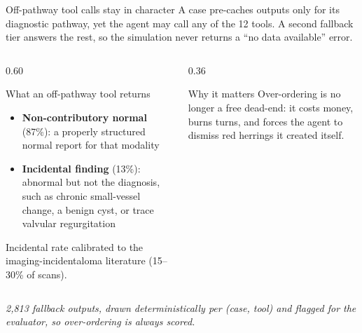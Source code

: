 \documentclass[aspectratio=169,t]{beamer}
\begin{document}
\begin{frame}{Off-pathway tool calls stay in character}
  \footnotesize
  A case pre-caches outputs only for its diagnostic pathway, yet the
  agent may call any of the 12 tools. A second \alert{fallback tier}
  answers the rest, so the simulation never returns a ``no data
  available'' error.

  \vspace{1mm}
  \begin{columns}[T,onlytextwidth]
    \begin{column}{0.60\textwidth}
      \begin{block}{What an off-pathway tool returns}
        \footnotesize
        \begin{itemize}\setlength\itemsep{0.3em}
          \item \textbf{Non-contributory normal} (87\%): a properly
                structured normal report for that modality
          \item \textbf{Incidental finding} (13\%): abnormal but not the
                diagnosis, such as chronic small-vessel change, a benign
                cyst, or trace valvular regurgitation
        \end{itemize}
        Incidental rate calibrated to the imaging-incidentaloma
        literature (15--30\% of scans).
      \end{block}
    \end{column}%
    \hfill
    \begin{column}{0.36\textwidth}
      \begin{exampleblock}{Why it matters}
        \footnotesize
        Over-ordering is no longer a free dead-end: it costs money,
        burns turns, and forces the agent to \alert{dismiss red
        herrings it created itself}.
      \end{exampleblock}
    \end{column}
  \end{columns}

  \vspace{1mm}
  \centering\scriptsize\itshape
  2{,}813 fallback outputs, drawn deterministically per (case, tool)
  and flagged for the evaluator, so over-ordering is always scored.
\end{frame}
\end{document}
